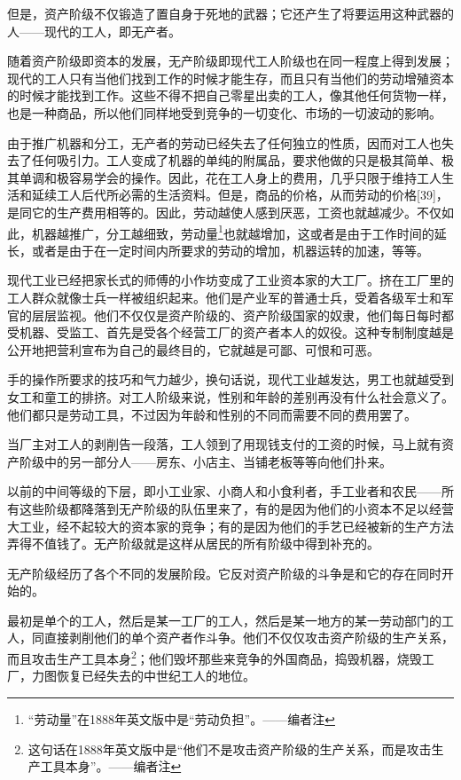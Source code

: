 \documentclass[UTF8,zihao=-4,a4paper]{ctexart}
\begin{document}
但是，资产阶级不仅锻造了置自身于死地的武器；它还产生了将要运用这种武器的人——现代的工人，即无产者。\par
随着资产阶级即资本的发展，无产阶级即现代工人阶级也在同一程度上得到发展；现代的工人只有当他们找到工作的时候才能生存，而且只有当他们的劳动增殖资本的时候才能找到工作。这些不得不把自己零星出卖的工人，像其他任何货物一样，也是一种商品，所以他们同样地受到竞争的一切变化、市场的一切波动的影响。\par
由于推广机器和分工，无产者的劳动已经失去了任何独立的性质，因而对工人也失去了任何吸引力。工人变成了机器的单纯的附属品，要求他做的只是极其简单、极其单调和极容易学会的操作。因此，花在工人身上的费用，几乎只限于维持工人生活和延续工人后代所必需的生活资料。但是，商品的价格，从而劳动的价格[39]，是同它的生产费用相等的。因此，劳动越使人感到厌恶，工资也就越减少。不仅如此，机器越推广，分工越细致，劳动量\footnote{“劳动量”在1888年英文版中是“劳动负担”。——编者注}也就越增加，这或者是由于工作时间的延长，或者是由于在一定时间内所要求的劳动的增加，机器运转的加速，等等。\par
现代工业已经把家长式的师傅的小作坊变成了工业资本家的大工厂。挤在工厂里的工人群众就像士兵一样被组织起来。他们是产业军的普通士兵，受着各级军士和军官的层层监视。他们不仅仅是资产阶级的、资产阶级国家的奴隶，他们每日每时都受机器、受监工、首先是受各个经营工厂的资产者本人的奴役。这种专制制度越是公开地把营利宣布为自己的最终目的，它就越是可鄙、可恨和可恶。\par
手的操作所要求的技巧和气力越少，换句话说，现代工业越发达，男工也就越受到女工和童工的排挤。对工人阶级来说，性别和年龄的差别再没有什么社会意义了。他们都只是劳动工具，不过因为年龄和性别的不同而需要不同的费用罢了。\par
当厂主对工人的剥削告一段落，工人领到了用现钱支付的工资的时候，马上就有资产阶级中的另一部分人——房东、小店主、当铺老板等等向他们扑来。\par
以前的中间等级的下层，即小工业家、小商人和小食利者，手工业者和农民——所有这些阶级都降落到无产阶级的队伍里来了，有的是因为他们的小资本不足以经营大工业，经不起较大的资本家的竞争；有的是因为他们的手艺已经被新的生产方法弄得不值钱了。无产阶级就是这样从居民的所有阶级中得到补充的。\par
无产阶级经历了各个不同的发展阶段。它反对资产阶级的斗争是和它的存在同时开始的。\par
最初是单个的工人，然后是某一工厂的工人，然后是某一地方的某一劳动部门的工人，同直接剥削他们的单个资产者作斗争。他们不仅仅攻击资产阶级的生产关系，而且攻击生产工具本身\footnote{这句话在1888年英文版中是“他们不是攻击资产阶级的生产关系，而是攻击生产工具本身”。——编者注}；他们毁坏那些来竞争的外国商品，捣毁机器，烧毁工厂，力图恢复已经失去的中世纪工人的地位。\par
\end{document}
